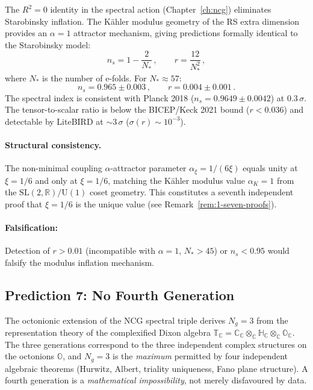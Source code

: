 The $R^2 = 0$ identity in the spectral action (Chapter~\ref{ch:ncg}) eliminates Starobinsky inflation. The K\"ahler modulus geometry of the RS extra dimension provides an $\alpha = 1$ attractor mechanism, giving predictions formally identical to the Starobinsky model:
\begin{equation}
\label{eq:1-inflation-pred}
n_s = 1 - \frac{2}{N_*}\,,\qquad r = \frac{12}{N_*^2}\,,
\end{equation}
where $N_*$ is the number of e-folds. For $N_* \approx 57$:
\begin{equation}
\label{eq:1-inflation-values}
n_s = 0.965 \pm 0.003\,,\qquad r = 0.004 \pm 0.001\,.
\end{equation}
The spectral index is consistent with Planck 2018 ($n_s = 0.9649 \pm 0.0042$) at $0.3\,\sigma$. The tensor-to-scalar ratio is below the BICEP/Keck 2021 bound ($r < 0.036$) and detectable by LiteBIRD at $\sim\!3\,\sigma$ ($\sigma(r) \sim 10^{-3}$).

\paragraph{Structural consistency.} The non-minimal coupling $\alpha$-attractor parameter $\alpha_\xi = 1/(6\xi)$ equals unity at $\xi = 1/6$ and only at $\xi = 1/6$, matching the K\"ahler modulus value $\alpha_K = 1$ from the $\mathrm{SL}(2,\mathbb{R})/\mathrm{U}(1)$ coset geometry. This constitutes a seventh independent proof that $\xi = 1/6$ is the unique value (see Remark~\ref{rem:1-seven-proofs}).

\paragraph{Falsification:} Detection of $r > 0.01$ (incompatible with $\alpha = 1$, $N_* > 45$) or $n_s < 0.95$ would falsify the modulus inflation mechanism.

\subsection{Prediction 7: No Fourth Generation}
\label{sec:1-pred7}

The octonionic extension of the NCG spectral triple derives $N_g = 3$ from the representation theory of the complexified Dixon algebra $\mathbb{T}_{\mathbb{C}} = \mathbb{C}_{\mathbb{C}} \otimes_{\mathbb{C}} \mathbb{H}_{\mathbb{C}} \otimes_{\mathbb{C}} \mathbb{O}_{\mathbb{C}}$. The three generations correspond to the three independent complex structures on the octonions $\mathbb{O}$, and $N_g = 3$ is the \emph{maximum} permitted by four independent algebraic theorems (Hurwitz, Albert, triality uniqueness, Fano plane structure). A fourth generation is a \emph{mathematical impossibility}, not merely disfavoured by data.

